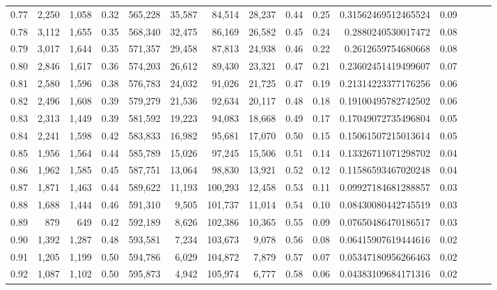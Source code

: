 \begin{tabular}{rrrrrrrrrrrrrrr}
0.77 &   2,250 &  1,058 &  0.32 &  565,228 &   35,587 &   84,514 &   28,237 &  0.44 &  0.25 &   0.31562469512465524 &      0.09 \\
0.78 &   3,112 &  1,655 &  0.35 &  568,340 &   32,475 &   86,169 &   26,582 &  0.45 &  0.24 &    0.2880240530017472 &      0.08 \\
0.79 &   3,017 &  1,644 &  0.35 &  571,357 &   29,458 &   87,813 &   24,938 &  0.46 &  0.22 &    0.2612659754680668 &      0.08 \\
0.80 &   2,846 &  1,617 &  0.36 &  574,203 &   26,612 &   89,430 &   23,321 &  0.47 &  0.21 &   0.23602451419499607 &      0.07 \\
0.81 &   2,580 &  1,596 &  0.38 &  576,783 &   24,032 &   91,026 &   21,725 &  0.47 &  0.19 &   0.21314223377176256 &      0.06 \\
0.82 &   2,496 &  1,608 &  0.39 &  579,279 &   21,536 &   92,634 &   20,117 &  0.48 &  0.18 &   0.19100495782742502 &      0.06 \\
0.83 &   2,313 &  1,449 &  0.39 &  581,592 &   19,223 &   94,083 &   18,668 &  0.49 &  0.17 &   0.17049072735496804 &      0.05 \\
0.84 &   2,241 &  1,598 &  0.42 &  583,833 &   16,982 &   95,681 &   17,070 &  0.50 &  0.15 &   0.15061507215013614 &      0.05 \\
0.85 &   1,956 &  1,564 &  0.44 &  585,789 &   15,026 &   97,245 &   15,506 &  0.51 &  0.14 &   0.13326711071298702 &      0.04 \\
0.86 &   1,962 &  1,585 &  0.45 &  587,751 &   13,064 &   98,830 &   13,921 &  0.52 &  0.12 &   0.11586593467020248 &      0.04 \\
0.87 &   1,871 &  1,463 &  0.44 &  589,622 &   11,193 &  100,293 &   12,458 &  0.53 &  0.11 &   0.09927184681288857 &      0.03 \\
0.88 &   1,688 &  1,444 &  0.46 &  591,310 &    9,505 &  101,737 &   11,014 &  0.54 &  0.10 &   0.08430080442745519 &      0.03 \\
0.89 &     879 &    649 &  0.42 &  592,189 &    8,626 &  102,386 &   10,365 &  0.55 &  0.09 &   0.07650486470186517 &      0.03 \\
0.90 &   1,392 &  1,287 &  0.48 &  593,581 &    7,234 &  103,673 &    9,078 &  0.56 &  0.08 &   0.06415907619444616 &      0.02 \\
0.91 &   1,205 &  1,199 &  0.50 &  594,786 &    6,029 &  104,872 &    7,879 &  0.57 &  0.07 &   0.05347180956266463 &      0.02 \\
0.92 &   1,087 &  1,102 &  0.50 &  595,873 &    4,942 &  105,974 &    6,777 &  0.58 &  0.06 &   0.04383109684171316 &      0.02 \\

\end{tabular}
